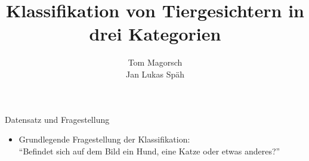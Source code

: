 \documentclass[aspectratio=1610, 9pt]{beamer}
\title{Klassifikation von Tiergesichtern in drei Kategorien}
\author[T.~Magorsch,~J.~L.~Späh]{Tom Magorsch\\ Jan Lukas Späh}
\institute[ML-Seminar]{\\[0.3cm]TU Dortmund \\ \Large ML-Seminar}
\begin{document}
\maketitle




\begin{frame}{Datensatz und Fragestellung}
\begin{itemize}
  \item Grundlegende Fragestellung der Klassifikation:\\
  \rightarrow{} ``Befindet sich auf dem Bild ein Hund, eine Katze oder etwas anderes?''
  \vspace{0.5cm}
\end{itemize}



\end{frame}
\end{document}
